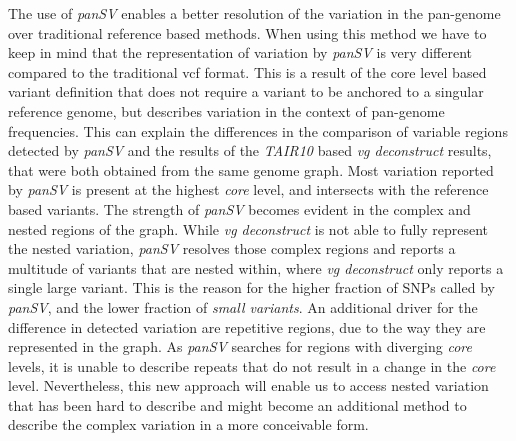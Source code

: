 The use of \textit{panSV} enables a better resolution of the variation in the pan-genome over traditional reference based methods. When using this method we have to keep in mind that the representation of variation by \textit{panSV} is very different compared to the traditional vcf format. This is a result of the core level based variant definition that does not require a variant to be anchored to a singular reference genome, but describes variation in the context of pan-genome frequencies. This can explain the differences in the comparison of variable regions detected by \textit{panSV} and the results of the \textit{TAIR10} \citep{Berardini2015-is} based \textit{vg deconstruct} \citep{Garrison2018-qh} results, that were both obtained from the same genome graph. Most variation reported by \textit{panSV} is present at the highest \textit{core} level, and intersects with the reference based variants. The strength of \textit{panSV} becomes evident in the complex and nested regions of the graph. While \textit{vg deconstruct} is not able to fully represent the nested variation, \textit{panSV} resolves those complex regions and reports a multitude of variants that are nested within, where \textit{vg deconstruct} only reports a single large variant. This is the reason for the higher fraction of SNPs called by \textit{panSV}, and the lower fraction of \textit{small variants}. An additional driver for the difference in detected variation are repetitive regions, due to the way they are represented in the graph. As \textit{panSV} searches for regions with diverging \textit{core} levels, it is unable to describe repeats that do not result in a change in the \textit{core} level. Nevertheless, this new approach will enable us to access nested variation that has been hard to describe and might become an additional method to describe the complex variation in a more conceivable form. \newline
